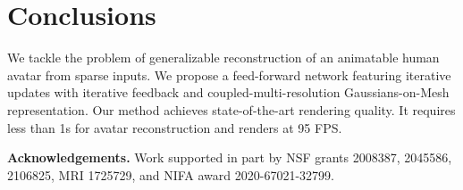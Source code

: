 \section{Conclusions}

We tackle the problem of generalizable reconstruction of an animatable human avatar from sparse inputs. We propose a feed-forward network featuring iterative updates with iterative feedback and coupled-multi-resolution Gaussians-on-Mesh representation. Our method achieves state-of-the-art rendering quality. It requires less than 1s for avatar reconstruction and renders at 95 FPS.

\noindent\textbf{Acknowledgements.} Work supported in part by NSF grants 2008387, 2045586, 2106825, MRI 1725729, and NIFA award 2020-67021-32799.


